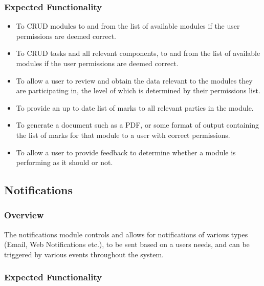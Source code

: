\documentclass[12pt]{article}
\begin{document}
		\subsubsection{Expected Functionality}
		
		\begin{itemize}
			\item To CRUD modules to and from the list of available modules if the user permissions are deemed correct.
			\item To CRUD tasks and all relevant components, to and from the list of available modules if the user permissions are deemed correct.
			\item To allow a user to review and obtain the data relevant to the modules they are participating in, the level of which is determined by their permissions list.
			\item To provide an up to date list of marks to all relevant parties in the module.
			\item To generate a document such as a PDF, or some format of output containing the list of marks for that module to a user with correct permissions.
			\item To allow a user to provide feedback to determine whether a module is performing as it should or not.
		\end{itemize}
	
	\pagebreak
	
	\subsection{Notifications}
	
		\subsubsection{Overview}
		
		The notifications module controls and allows for notifications of various types (Email, Web Notifications etc.), to be sent based on a users needs, and can be triggered by various events throughout the system.
		
		\subsubsection{Expected Functionality}
		
\end{document}

